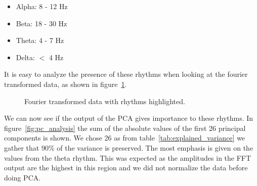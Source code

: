 \begin{itemize}
	\item Alpha: 8 - 12 Hz
	\item Beta: 18 - 30 Hz
	\item Theta: 4 - 7 Hz
	\item Delta: $<$ 4 Hz
\end{itemize}

It is easy to analyze the presence of these rhythms when looking at the fourier transformed data, as shown in figure~\ref{fig:eeg_with_rhythm}.

\begin{figure}
	\centering	
	
	\caption{Fourier transformed data with rhythms highlighted.}
	\label{fig:eeg_with_rhythm}
\end{figure}

We can now see if the output of the PCA gives importance to these rhythms. In figure~\ref{fig:pc_analysis} the sum of the absolute values of the first 26 principal components is shown. We chose 26 as from table~\ref{tab:explained_variance} we gather that 90\% of the variance is preserved. The most emphasis is given on the values from the theta rhythm. This was expected as the amplitudes in the FFT output are the highest in this region and we did not normalize the data before doing PCA.

